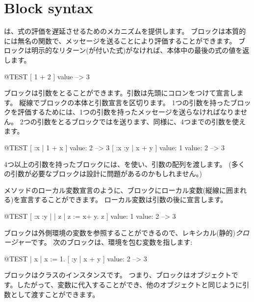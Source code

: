 \documentclass[a4paper,10pt,twoside]{book}
\begin{document}
\section{Block syntax}

は、式の評価を遅延させるためのメカニズムを提供します。
ブロックは本質的には無名の関数で、メッセージを送ることにより評価することができます。
ブロックは明示的なリターン(\ct{^}が付いた式)がなければ、本体中の最後の式の値を返します。

\begin{code}{@TEST}
[ 1 + 2 ] value --> 3
\end{code}

ブロックは引数をとることができます。引数は先頭にコロンをつけて宣言します。
縦線でブロックの本体と引数宣言を区切ります。
1つの引数を持ったブロックを評価するためには、1つの引数を持ったメッセージを送らなければなりません。
2つの引数をとるブロックではを送ります、同様に、4つまでの引数を使えます。

\begin{code}{@TEST}
[ :x | 1 + x ] value: 2 --> 3
[ :x :y | x + y ] value: 1 value: 2 --> 3
\end{code}

4つ以上の引数を持ったブロックには、を使い、引数の配列を渡します。
(多くの引数が必要なブロックは設計に問題があるのかもしれません。)

メソッドのローカル変数宣言のように、ブロックにローカル変数(縦線に囲まれる)を宣言することができます。
ローカル変数は引数の後に宣言します。

\begin{code}{@TEST}
[ :x :y | | z | z := x+ y. z ] value: 1 value: 2 --> 3
\end{code}

ブロックは外側環境の変数を参照することができるので、レキシカル(静的)\emph{クロージャー}です。
次のブロックは、環境を包む変数を指します:

\begin{code}{@TEST}
| x |
x := 1.
[ :y | x + y ] value: 2 --> 3
\end{code}

ブロックはクラスのインスタンスです。
つまり、ブロックはオブジェクトです。したがって、変数に代入することができ、他のオブジェクトと同じように引数として渡すことができます。
\end{document}

